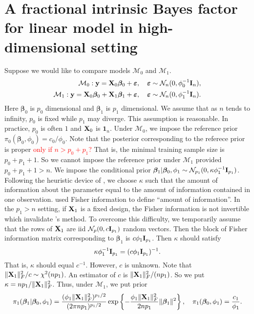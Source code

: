 \documentclass[11pt]{article}
\newcommand\CG[1]{\textcolor{red}{#1}}
\newcommand{\By}{\mathbf{y}}    \newcommand{\Bz}{\mathbf{z}}
\newcommand{\bfsym}[1]{\ensuremath{\boldsymbol{#1}}}
\def\bbeta{\bfsym \beta}
\theoremstyle{plain}
\theoremstyle{definition}
\theoremstyle{remark}
\begin{document}
\section{A fractional intrinsic Bayes factor for linear model in high-dimensional setting}
Suppose we would like to compare models $\mathcal M_0$ and $\mathcal M_1$.
\begin{align*}
    \mathcal M_0:   \By = \BX_0 \bbeta_0 + \bepsilon,\quad \bepsilon\sim \mathcal N_n(0,\phi_0^{-1} \BI_n),
    \\
    \mathcal M_1:   \By = \BX_0 \bbeta_0 + \BX_1 \bbeta_1 + \bepsilon,\quad \bepsilon\sim \mathcal N_n(0,\phi_1^{-1} \BI_n).
\end{align*}
Here $\bbeta_0$ is $p_0$ dimensional and $\bbeta_1$ is $p_1$ dimensional.
We assume that as $n$ tends to infinity, $p_0$ is fixed while $p_1$ may diverge.
This assumption is reasonable.
In practice, $p_0$ is often $1$ and $\mathbf{X}_0$ is $\mathbf 1_n$.
Under $\mathcal M_0$, we impose the reference prior $\pi_0 (\bbeta_0,\phi_0)=c_0/\phi_0$.
Note that the posterior corresponding to the referece prior is proper \CG{only if $n>p_0 + p_1$?}
That is, the minimal training sample size is $p_0 + p_1 +1$.
So we cannot impose the reference prior under $\mathcal M_1$ provided $p_0 + p_1 +1 >n$.
We impose the conditional prior $\bbeta_1|\bbeta_0, \phi_1 \sim \mathcal N_{p_1} (0, \kappa \phi_1^{-1} \BI_{p_1}) $.
Following the heuristic device of \cite{Kass1995}, we choose $\kappa$ such that the amount of information about the parameter equal to the amount of information contained in one observation.
\cite{Kass1995} used Fisher information to define ``amount of information''.
In the $p_1>n$ setting, if $\mathbf{X}_1$ is a fixed design, the Fisher information is not invertible which invalidate \cite{Kass1995}'s method.
To overcome this difficulty, we temporarily assume that the rows of $\mathbf{X}_1$ are iid $\mathcal N_p (0, c \mathbf{I}_{p_1} )$ random vectors.
Then the block of Fisher information matrix corresponding to $\bbeta_1$ is
$c\phi_1 \mathbf{I}_{p_1}$.
Then $\kappa$ should satisfy
\begin{equation*}
    \kappa \phi_1^{-1} \mathbf{I}_{p_1}  = (c\phi_1 \mathbf{I}_{p_1})^{-1}.
\end{equation*}
That is, $\kappa$ should equal $c^{-1}$.
However, $c$ is unknown.
Note that $\|\mathbf{X}_1\|_F^2/c\sim \chi^2(n p_1)$.
An estimator of $c$ is $\|\mathbf{X}_1\|_F^2/(np_1)$.
So we put $\kappa=np_1/\|\mathbf{X}_1\|_F^2$.
Thus, under $\mathcal M_1$, we put prior
\begin{equation*}
    \pi_1 (\bbeta_1 | \bbeta_0, \phi_1) =\frac{(\phi_1 \|\BX_1\|_F^2)^{p_1/2}}{(2\pi n p_1 )^{p_1/2}}  
    \exp\left\{
        -\frac{\phi_1 \|\BX_1\|_F^2}{2 n p_1} \|\bbeta_1\|^2
    \right\}
    ,\quad
    \pi_1(\bbeta_0, \phi_1) = \frac{c_1}{\phi_1}.
\end{equation*}
\end{document}

